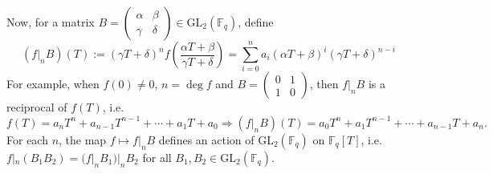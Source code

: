\documentclass[10pt,reqno]{amsproc}
\newcommand{\GL}{\mathrm{GL}}
\newcommand{\bF}{\mathbb{F}}
\newcommand{\1}{\mathds{1}}	%
\theoremstyle{definition}
\theoremstyle{remark}
\begin{document}
Now, for a matrix $B = \left(\begin{smallmatrix}
        \alpha & \beta \\ \gamma & \delta
    \end{smallmatrix}\right) \in \GL_2(\bF_q)$, define
\begin{equation}
    (f|_n B)(T) := (\gamma T + \delta)^n f\left(\frac{\alpha T + \beta}{\gamma T + \delta}\right) = \sum_{i=0}^{n} a_i (\alpha T + \beta)^i (\gamma T + \delta)^{n-i} \label{eqn:GL2action}
\end{equation}
For example, when $f(0) \ne 0$, $n = \deg f$ and $B = \left(\begin{smallmatrix}
    0 & 1 \\ 1 & 0 \end{smallmatrix}\right)$, then $f|_n B$ is a reciprocal of $f(T)$, i.e.
\[
f(T) = a_n T^n + a_{n-1} T^{n-1} + \cdots + a_1 T + a_0 \Rightarrow (f|_n B)(T) = a_0 T^n + a_1 T^{n-1} + \cdots + a_{n-1} T + a_n.
\]
For each $n$, the map $f \mapsto f|_n B$ defines an action of $\GL_2(\bF_q)$ on $\bF_q[T]$, i.e. $f|_{n}(B_1 B_2 ) = (f|_{n}B_1)|_{n}B_2$ for all $B_1, B_2 \in \GL_2(\bF_q)$.
\end{document}
